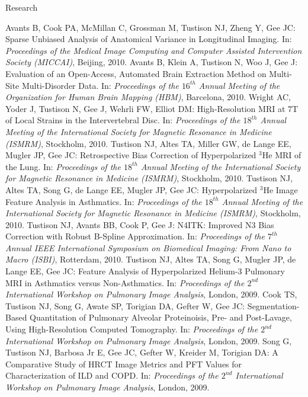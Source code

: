 \documentclass{resume}
\begin{document}
\begin{category}{Research}
\begin{itemize}
    \citemnobullet Avants B, Cook PA, McMillan C, Grossman M, Tustison NJ, Zheng Y, Gee JC:  Sparse Unbiased Analysis of Anatomical Variance in Longitudinal Imaging.  In: {\em Proceedings of the Medical Image Computing and Computer Assisted Intervention Society (MICCAI)}, Beijing, 2010.
    \citemnobullet Avants B, Klein A, Tustison N, Woo J, Gee J:  Evaluation of an Open-Access, Automated Brain Extraction Method on Multi-Site Multi-Disorder Data. In:  {\em Proceedings of the $16^{th}$ Annual Meeting of the Organization for Human Brain Mapping (HBM)}, Barcelona, 2010.   
    \citemnobullet Wright AC, Yoder J, Tustison N, Gee J, Wehrli FW, Elliot DM:  High-Resolution MRI at 7T of Local Strains in the Intervertebral Disc. In:  {\em Proceedings of the $18^{th}$ Annual Meeting of the International Society for Magnetic Resonance in Medicine (ISMRM)}, Stockholm, 2010.   
    \citemnobullet Tustison NJ, Altes TA, Miller GW, de Lange EE, Mugler JP, Gee JC: Retrospective Bias Correction of Hyperpolarized $^3$He MRI of the Lung. In:  {\em Proceedings of the $18^{th}$ Annual Meeting of the International Society for Magnetic Resonance in Medicine (ISMRM)}, Stockholm, 2010.   
    \citemnobullet Tustison NJ, Altes TA, Song G, de Lange EE, Mugler JP, Gee JC: Hyperpolarized $^3$He Image Feature Analysis in Asthmatics. In:  {\em Proceedings of the $18^{th}$ Annual Meeting of the International Society for Magnetic Resonance in Medicine (ISMRM)}, Stockholm, 2010.   
    \citemnobullet  Tustison NJ, Avants BB, Cook P, Gee J: N4ITK:  Improved N3 Bias Correction with Robust B-Spline Approximation. In:  {\em Proceedings of the $7^{th}$ Annual IEEE International Symposium on Biomedical Imaging: From Nano to Macro (ISBI)}, Rotterdam, 2010.
    \citemnobullet Tustison NJ, Altes TA, Song G, Mugler JP, de Lange EE, Gee JC: Feature Analysis of Hyperpolarized Helium-3 Pulmonary MRI in Asthmatics versus Non-Asthmatics. In: {\em Proceedings of the $2^{nd}$ International Workshop on Pulmonary Image Analysis}, London, 2009.
    \citemnobullet Cook TS, Tustison NJ, Song G, Awate SP, Torigian DA, Gefter W, Gee JC: Segmentation-Based Quantitation of Pulmonary Alveolar Proteinoisis, Pre- and Post-Lavage, Using High-Resolution Computed Tomography. In: {\em Proceedings of the $2^{nd}$ International Workshop on Pulmonary Image Analysis}, London, 2009.
    \citemnobullet Song G, Tustison NJ, Barbosa Jr E, Gee JC, Gefter W, Kreider M, Torigian DA: A Comparative Study of HRCT Image Metrics and PFT Values for Characterization of ILD and 
COPD. In: {\em Proceedings of the $2^{nd}$ International Workshop on Pulmonary Image Analysis}, London, 2009.

\end{itemize}
\end{category}
\end{document}
